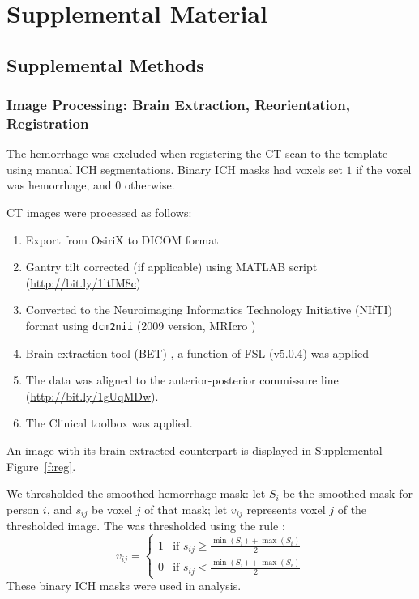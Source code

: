 \documentclass[10pt]{article}\usepackage[]{graphicx}\usepackage[]{color}
\begin{document}
\section{Supplemental Material}

\subsection{Supplemental Methods}
\subsubsection{Image Processing: Brain Extraction, Reorientation, Registration}
\label{sec:processing}
The hemorrhage was excluded when registering the CT scan to the template using manual ICH segmentations.  Binary ICH masks had voxels set $1$ if the voxel was hemorrhage, and $0$ otherwise.  

CT images were processed as follows:
\begin{enumerate}
\item Export from OsiriX to DICOM format
\item Gantry tilt corrected (if applicable) using MATLAB script (\url{http://bit.ly/1ltIM8c})
\item Converted to the Neuroimaging Informatics Technology Initiative (NIfTI) format using \verb|dcm2nii| (2009 version, MRIcro \citep{rorden_stereotaxic_2000})
\item Brain extraction tool (BET) \citep{smith_fast_2002}, a function of FSL (v5.0.4) \citep{jenkinson_fsl_2012} was applied
\item The data was aligned to the anterior-posterior commissure line (\url{http://bit.ly/1gUqMDw}).
\item The Clinical toolbox \citep{rorden_age-specific_2012} was applied.
\end{enumerate}
 An image with its brain-extracted counterpart is displayed in Supplemental Figure~\ref{f:reg}\protect{}.

We thresholded the smoothed hemorrhage mask: let $S_i$ be the smoothed mask for person $i$, and $s_{ij}$ be voxel $j$ of that mask; let $v_{ij}$ represents voxel $j$ of the thresholded image.  The was thresholded using the rule \citep{rorden_age-specific_2012}:
$$
v_{ij} =
\begin{cases}
1  & \text{if } s_{ij} \geq \frac{\min(S_i) + \max(S_i)}{2}\\
0  & \text{if } s_{ij} < \frac{\min(S_i) + \max(S_i)}{2}
\end{cases}
$$
These binary ICH masks were used in analysis.  
\end{document}
